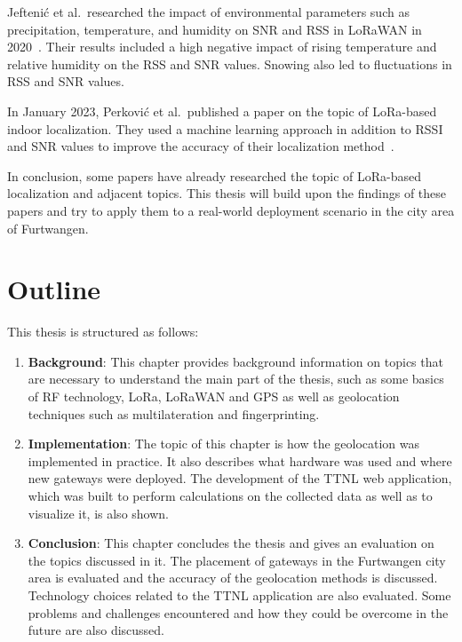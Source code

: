 Jeftenić et al.\ researched the impact of environmental parameters such as precipitation, temperature, and humidity on \ac{SNR} and \ac{RSS} in \ac{LoRaWAN} in 2020~\cite{jeftenic_impact_2020}.
Their results included a high negative impact of rising temperature and relative humidity on the \ac{RSS} and \ac{SNR} values.
Snowing also led to fluctuations in \ac{RSS} and \ac{SNR} values.

In January 2023, Perković et al.\ published a paper on the topic of \ac{LoRa}-based indoor localization.
They used a machine learning approach in addition to \ac{RSSI} and \ac{SNR} values to improve the accuracy of their localization method~\cite{perkovic_machine_2023}.

In conclusion, some papers have already researched the topic of \ac{LoRa}-based localization and adjacent topics.
This thesis will build upon the findings of these papers and try to apply them to a real-world deployment scenario in the city area of Furtwangen.

\section{Outline}

This thesis is structured as follows:

\begin{enumerate}
      \item \textbf{Background}:
            This chapter provides background information on topics that are necessary to understand the main part of the thesis, such as some basics of \ac{RF} technology, \ac{LoRa}, \ac{LoRaWAN} and \ac{GPS} as well as geolocation techniques such as multilateration and fingerprinting.
      \item \textbf{Implementation}:
            The topic of this chapter is how the geolocation was implemented in practice.
            It also describes what hardware was used and where new gateways were deployed.
            The development of the \ac{TTNL} web application, which was built to perform calculations on the collected data as well as to visualize it, is also shown.
      \item \textbf{Conclusion}:
            This chapter concludes the thesis and gives an evaluation on the topics discussed in it.
            The placement of gateways in the Furtwangen city area is evaluated and the accuracy of the geolocation methods is discussed.
            Technology choices related to the \ac{TTNL} application are also evaluated.
            Some problems and challenges encountered and how they could be overcome in the future are also discussed.
\end{enumerate}

